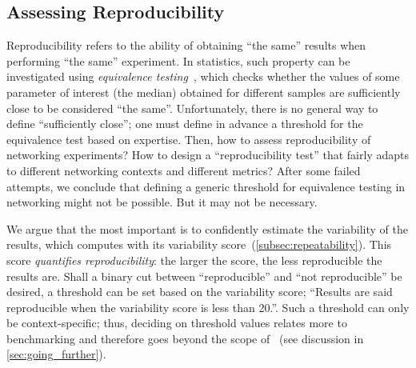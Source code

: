 

\subsection{Assessing Reproducibility}
\label{subsec:reproducibility}

Reproducibility refers to the ability of obtaining ``the same'' results when performing ``the same'' experiment.
In statistics, such property can be investigated using \textit{equivalence testing}~\cite{lakens2017Equivalence}, which checks whether the values of some parameter of interest (\eg the median) obtained for different samples are sufficiently close to be considered ``the same''.
Unfortunately, there is no general way to define ``sufficiently close''; one must define in advance a threshold for the equivalence test based on expertise.
Then, how to assess reproducibility of networking experiments? How to design a ``reproducibility test'' that fairly adapts to different networking contexts and different metrics?
After some failed attempts, we conclude that defining a generic threshold for equivalence testing in networking might not be possible. But it may not be necessary.

We argue that the most important is to confidently estimate the variability of the results, which \triscale computes with its variability score~(\cref{subsec:repeatability}).
This score \emph{quantifies reproducibility}: the larger the score, the less reproducible the results are.
Shall a binary cut between ``reproducible'' and ``not reproducible'' be desired, a threshold can be set based on the variability score; \eg ``Results are said reproducible when the variability score is less than 20\mbps.''.
Such a threshold can only be context-specific; thus, deciding on threshold values relates more to benchmarking and therefore goes beyond the scope of \triscale~(see discussion in \cref{sec:going_further}).
